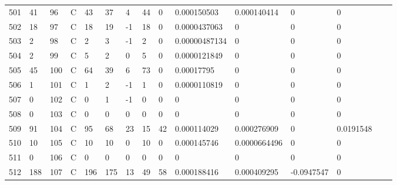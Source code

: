 \begin{longtable}{lllllllllllllll}
	501 & 41                & 96  & C   & 43                & 37                & 4                 & 44   & 0          & 0.000150503    & 0.000140414    & 0             & 0            \\
	502 & 18                & 97  & C   & 18                & 19                & -1                & 18   & 0          & 0.0000437063   & 0              & 0             & 0            \\
	503 & 2                 & 98  & C   & 2                 & 3                 & -1                & 2    & 0          & 0.00000487134  & 0              & 0             & 0            \\
	504 & 2                 & 99  & C   & 5                 & 2                 & 0                 & 5    & 0          & 0.0000121849   & 0              & 0             & 0            \\
	505 & 45                & 100 & C   & 64                & 39                & 6                 & 73   & 0          & 0.00017795     & 0              & 0             & 0            \\
	506 & 1                 & 101 & C   & 1                 & 2                 & -1                & 1    & 0          & 0.0000110819   & 0              & 0             & 0            \\
	507 & 0                 & 102 & C   & 0                 & 1                 & -1                & 0    & 0          & 0              & 0              & 0             & 0            \\
	508 & 0                 & 103 & C   & 0                 & 0                 & 0                 & 0    & 0          & 0              & 0              & 0             & 0            \\
	509 & 91                & 104 & C   & 95                & 68                & 23                & 15   & 42         & 0.000114029    & 0.000276909    & 0             & 0.0191548    \\
	510 & 10                & 105 & C   & 10                & 10                & 0                 & 10   & 0          & 0.000145746    & 0.0000664496   & 0             & 0            \\
	511 & 0                 & 106 & C   & 0                 & 0                 & 0                 & 0    & 0          & 0              & 0              & 0             & 0            \\
	512 & 188               & 107 & C   & 196               & 175               & 13                & 49   & 58         & 0.000188416    & 0.000409295    & -0.0947547    & 0            \\

\end{longtable}
